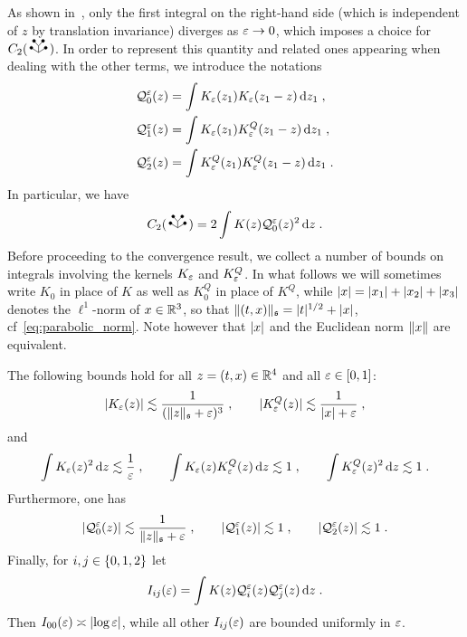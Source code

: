 \documentclass[reqno,11pt]{article}
\def\KQ{K^Q}
\def\fraks{\mathfrak{s}}
\begin{document}
As shown in~\cite[Thm.~10.22]{Hairer2014}, only the first integral on the
right-hand side (which is independent of $z$ by translation invariance) diverges
as $\varepsilon\to0$, which imposes a choice for $C_2(\RSWV)$. In order to represent
this quantity and related ones appearing when dealing with the other terms, we
introduce the notations 
\begin{align}
\nonumber
\cQ_0^\eps(z) &= \int K_\eps(z_1)K_\eps(z_1-z)\6z_1\;, \\
\nonumber
\cQ_1^\eps(z) &= \int K_\eps(z_1)\KQ_\eps(z_1-z)\6z_1\;, \\
\cQ_2^\eps(z) &= \int \KQ_\eps(z_1)\KQ_\eps(z_1-z)\6z_1\;.
\label{eq:rFHN20} 
\end{align}
In particular, we have 
\begin{equation}
C_2(\RSWV)  = 2 \int K(z)\cQ_0^\eps(z)^2\6z\;. 
\label{eq:rFHN21}
\end{equation} 
%
Before proceeding to the convergence result, we collect a number of bounds on
integrals involving the kernels $K_\varepsilon$ and $\KQ_\eps$. In what follows we will
sometimes write $K_0$ in place of $K$ as well as $\KQ_0$ in place of $\KQ$,
while $\lvert x\rvert=\lvert x_1\rvert+\lvert x_2\rvert+\lvert x_3\rvert$ denotes the $\ell^1$-norm of
$x\in\mathbb{R}^3$, so that $\norm{(t,x)}_{\fraks} = \abs{t}^{1/2}+\abs{x}$,
cf~\eqref{eq:parabolic_norm}. Note however that $\lvert x\rvert$ and the Euclidean norm
$\lVert x\rVert$ are equivalent. 

\begin{lemma}
\label{lem:KKQ}
The following bounds hold for all $z=(t,x)\in\mathbb{R}^4$ and all $\varepsilon\in[0,1]$:
\begin{equation}
 \label{eq:KKQ01}
 \abs{K_\eps(z)} \lesssim \frac{1}{(\norm{z}_\fraks+\eps)^3}\;, 
 \qquad
 \abs{\KQ_\eps(z)} \lesssim \frac{1}{\abs{x}+\eps}\;, 
\end{equation} 
and 
\begin{equation}
 \label{eq:KKQ02}
 \int K_\eps(z)^2\6z \lesssim \frac1\eps\;, \qquad
 \int K_\eps(z)\KQ_\eps(z)\6z \lesssim 1\;, \qquad
 \int \KQ_\eps(z)^2\6z \lesssim 1\;. 
\end{equation} 
Furthermore, one has 
\begin{equation}
 \label{eq:KKQ03}
 \abs{\cQ_0^\eps(z)} \lesssim \frac{1}{\norm{z}_\fraks+\eps}\;, 
 \qquad
 \abs{\cQ_1^\eps(z)} \lesssim 1\;, 
 \qquad
 \abs{\cQ_2^\eps(z)} \lesssim 1\;. 
\end{equation}
Finally, for $i,j\in\{0,1,2\}$ let 
\begin{equation}
 \label{eq:KKQ04}
 I_{ij}(\eps) = \int K(z) \cQ_i^\eps(z)\cQ_j^\eps(z)\6z\;.  
\end{equation} 
Then $I_{00}(\varepsilon) \asymp \lvert\log\varepsilon\rvert$, while all other $I_{ij}(\varepsilon)$
are bounded uniformly in $\varepsilon$. 
\end{lemma}
\end{document}
